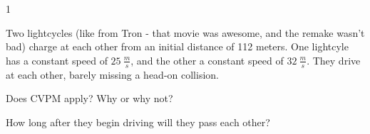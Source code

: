 
\AddToShipoutPicture*{\BackgroundPic}

\addtocounter {ProbNum} {1}

 
{\bf \Large{}} Two lightcycles (like from Tron - that movie was awesome, and the remake wasn't bad) charge at each other from an initial distance of 112 meters.  One lightcyle has a constant speed of ${25~\tfrac{m}{s}}$, and the other a constant speed of ${32~\tfrac{m}{s}}$. They drive at each other, barely missing a head-on collision.  


\bigskip
Does CVPM apply? Why or why not?

\vspace{30mm}

How long after they begin driving will they pass each other?
 
\vfill

\newpage